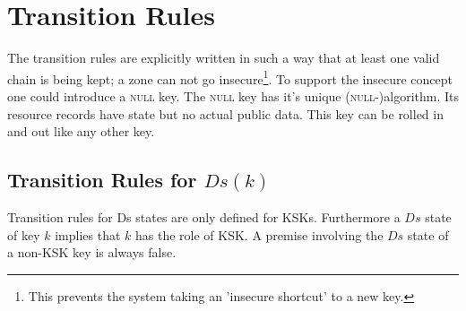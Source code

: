 \documentclass[twoside,english, a4paper]{article}
\begin{document}


\section{Transition Rules}

The transition rules are explicitly written in such a way that at 
least one valid chain is being kept; a zone can not go insecure\footnote{
This prevents the system taking an 'insecure shortcut' to a new key.}. To support the insecure concept one could introduce a 
\textsc{null} key. The \textsc{null} key has it's unique (\textsc 
{null}-)algorithm. Its resource records have state but no actual 
public data. This key can be rolled in and out like any other key.

\subsection{Transition Rules for $Ds(k)$}

Transition rules for Ds states are only defined for KSKs. Furthermore
a $Ds$ state of key $k$ implies that $k$ has the role of KSK. A premise 
involving the $Ds$ state of a non-KSK key is always false.
\end{document}
